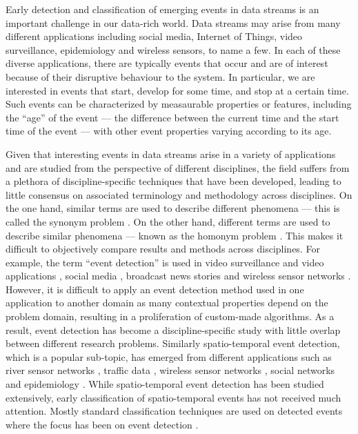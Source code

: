 \documentclass[a4paper,11pt]{article}
\begin{document}
Early detection and classification of emerging events in data streams is an important challenge in our data-rich world. Data streams may arise from many different applications including social media, Internet of Things, video surveillance, epidemiology and wireless sensors, to name a few. In each of these diverse applications, there are typically events that occur and are of interest because of their disruptive behaviour to the system. In particular, we are interested in events that start, develop for some time, and stop at a certain time. Such events can be characterized by measaurable properties or features, including the ``age'' of the event --- the difference between the current time and the start time of the event --- with other event properties varying according to its age.

Given that interesting events in data streams arise in a variety of applications and are studied from the perspective of different disciplines, the field suffers from a plethora of discipline-specific techniques that have been developed, leading to little consensus on associated terminology and methodology across disciplines. On the one hand, similar terms are used to describe different phenomena --- this is called the synonym problem \citep{zhou2014spatiotemporal}. On the other hand, different terms are used to describe similar phenomena --- known as the homonym problem \citep{zhou2014spatiotemporal}. This makes it difficult to objectively compare results and methods across disciplines. For example, the term ``event detection'' is used in video surveillance and video applications \citep{adam2008robust, ke2005efficient, medioni2001event}, social media \citep{weng2011event, li2012tedas, abdelhaq2013eventweet}, broadcast news stories \citep{allan1998line, li2005probabilistic} and wireless sensor networks \citep{yin2009spatio, mao2015online}. However, it is difficult to apply an event detection method used in one application to another domain as many contextual properties depend on the problem domain, resulting in a proliferation of custom-made algorithms. As a result, event detection has become a discipline-specific study with little overlap between different research problems. Similarly spatio-temporal event detection, which is a popular sub-topic, has emerged from different applications such as river sensor networks \citep{mao2015online}, traffic data \citep{souto2016event}, wireless sensor networks \citep{mousavi2013spatio}, social networks \citep{cheng2014event} and epidemiology \citep{gomide2011dengue}. While spatio-temporal event detection has been studied extensively, early classification of spatio-temporal events has not received much attention. Mostly standard classification techniques are used on detected events where the focus has been on event detection \citep{kang2014detecting}.
\end{document}
